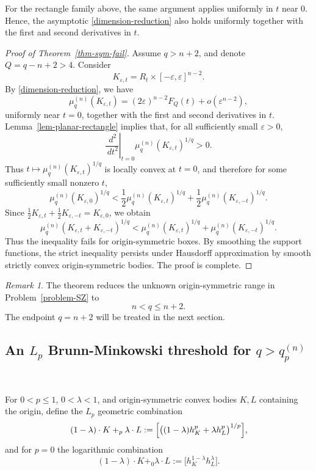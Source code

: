 \documentclass[12pt,leqno]{amsart}
\theoremstyle{plain} \newtheorem{thm}{Theorem}[section]
\theoremstyle{plain} \newtheorem{prop}[thm]{Proposition}
\theoremstyle{plain} \newtheorem{prob}[thm]{Problem}
\theoremstyle{definition} \newtheorem{defi}[thm]{Definition}
\theoremstyle{plain} \newtheorem{cor}[thm]{Corollary}
\theoremstyle{plain} \newtheorem{lem}[thm]{Lemma}
\theoremstyle{plain} \newtheorem{eg}{Example}[section]
\theoremstyle{remark} \newtheorem{rmk}[thm]{Remark}
\theoremstyle{plain} \newtheorem{conj}{Conjecture}
\numberwithin{equation}{section}
\newcommand{\dd}{\,d}
\begin{document}
For the rectangle family above, the same argument applies uniformly in $t$ near $0$. 
Hence, the asymptotic \eqref{dimension-reduction} also holds uniformly together with the first and second derivatives in $t$.

\begin{proof}[Proof of Theorem~\ref{thm-sym-fail}]
Assume $q>n+2$, and denote $Q=q-n+2>4.$ Consider
\[
    K_{\varepsilon,t}=R_t\times[-\varepsilon,\varepsilon]^{n-2}.
\]
By \eqref{dimension-reduction}, we have
\[
    \mu_q^{(n)}(K_{\varepsilon,t})
    =(2\varepsilon)^{n-2}F_Q(t)+o(\varepsilon^{n-2}),
\]
uniformly near $t=0$, together with the first and second derivatives in $t$. 
Lemma~\ref{lem-planar-rectangle} implies that, for all sufficiently small $\varepsilon>0$,
\[
    \left.\frac{\dd^2}{\dd t^2}\right|_{t=0}\mu_q^{(n)}(K_{\varepsilon,t})^{1/q}>0.
\]
Thus $t\mapsto \mu_q^{(n)}(K_{\varepsilon,t})^{1/q}$ is locally convex at $t=0$, and therefore for some sufficiently small nonzero $t$,
\[
    \mu_q^{(n)}(K_{\varepsilon,0})^{1/q}
    <
    \frac12\mu_q^{(n)}(K_{\varepsilon,t})^{1/q}
    +\frac12\mu_q^{(n)}(K_{\varepsilon,-t})^{1/q}.
\]
Since $\frac{1}{2}K_{\varepsilon,t}+\frac{1}{2}K_{\varepsilon,-t}=K_{\varepsilon,0}$, we obtain
\[
    \mu_q^{(n)}(K_{\varepsilon,t}+K_{\varepsilon,-t})^{1/q}
    <
    \mu_q^{(n)}(K_{\varepsilon,t})^{1/q}
    +\mu_q^{(n)}(K_{\varepsilon,-t})^{1/q}.
\]
Thus the inequality fails for origin-symmetric boxes. By smoothing the support functions, the strict inequality persists under Hausdorff approximation by smooth strictly convex origin-symmetric bodies. The proof is complete.
\end{proof}

\begin{rmk}
The theorem reduces the unknown origin-symmetric range in Problem~\ref{problem-SZ} to
\[
    n<q\le n+2.
\]
The endpoint $q=n+2$ will be treated in the next section.
\end{rmk}
\subsection{An \(L_p\) Brunn-Minkowski threshold for \(q>q_p^{(n)}\)}\label{sec-Lp-threshold} \

For \(0<p\le1\), \(0<\lambda<1\), and origin-symmetric convex bodies \(K,L\) containing the origin, define the \(L_p\) geometric combination
\[
(1-\lambda) \cdot K+_{p} \lambda\cdot L
:=\Bigl[\bigl((1-\lambda)h_K^p+\lambda h_L^p\bigr)^{1/p}\Bigr],
\]
and for \(p=0\) the logarithmic combination
\[
(1-\lambda)\cdot K+_{0} \lambda \cdot L:=\bigl[h_K^{1-\lambda}h_L^\lambda\bigr].
\]
\end{document}

